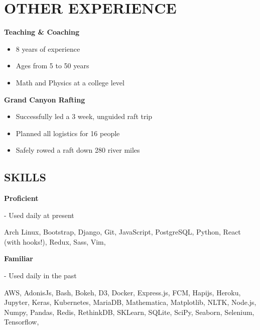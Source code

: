 \documentclass[12pt]{resume}
\begin{document}
\begin{minipage}[t]{0.369\textwidth}
        \vspace{-1em}
        {\section* {OTHER EXPERIENCE}}
        \vspace{.5em}
        {\par \bf Teaching \& Coaching}
        \begin{itemize}
          \setlength\itemsep{-.2em}
          \item {8 years of experience}
          \item {Ages from 5 to 50 years}
          \item {Math and Physics at a college level}
        \end{itemize}
        {\par \bf Grand Canyon Rafting}
        \vspace{-.75em}
        \begin{itemize}
          \setlength\itemsep{-.2em}
          \item {Successfully led a 3 week, unguided raft trip}
          \item {Planned all logistics for 16 people}
          \item {Safely rowed a raft down 280 river miles}
        \end{itemize}
        \begin{tcolorbox}[colback=white]
        \vspace{-.8em}
        {\section* {SKILLS}}
        {\par \bf Proficient} - Used daily at present
        \vspace{.25em}
        \par {
          Arch Linux, Bootstrap, Django, Git, JavaScript, PostgreSQL, Python,
          React (with hooks!), Redux, Sass, Vim,
        }
        \vspace{1em}
        {\par \bf Familiar} - Used daily in the past
        \vspace{.25em}
        \par { 
          AWS, AdonisJs, Bash, Bokeh, D3, Docker, Express.js, FCM,
          Hapijs, Heroku, Jupyter, Keras, Kubernetes, MariaDB,
          Mathematica, Matplotlib, NLTK, Node.js, Numpy, Pandas, Redis,
          RethinkDB, SKLearn, SQLite, SciPy, Seaborn, Selenium,
          Tensorflow, 
        }
        \end{tcolorbox}
    \end{minipage}
\end{document}
